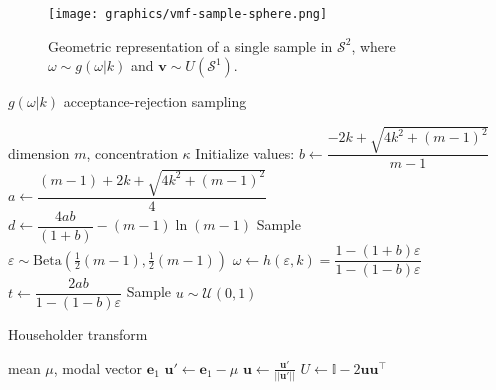 \documentclass[letterpaper]{article}
\newcommand{\e}{\mathbf{e}}
\newcommand{\uv}{\mathbf{u}}
\newcommand{\vv}{\mathbf{v}}
\begin{document}
\begin{figure}[H]\label{fig:sphere-sample-example}
  \centering
  \texttt{[image: graphics/vmf-sample-sphere.png]}
  \caption{Geometric representation of a single sample in $\mathcal{S}^2$, where $\omega \sim g(\omega|k)$ and $\vv \sim U(\mathcal{S}^{1})$.}
\end{figure}

\begin{minipage}[t]{8cm}
  \vspace{0pt}  
\begin{algorithm}[H]
    \centering
   \caption{$g(\omega| k)$ acceptance-rejection sampling}
   \label{alg:g-sample}
\begin{algorithmic}
     dimension $m$, concentration $\kappa$
    \STATE Initialize values:
    \STATE $b \gets \dfrac{-2k + \sqrt{4k^2 + (m-1)^2}}{m - 1}$\\
    \STATE $a \gets \dfrac{(m-1) + 2k +\sqrt{4k^2+(m-1)^2}}{4}$\\
    \STATE $d \gets \dfrac{4ab}{(1+b)} - (m - 1)\ln (m-1)$
    \REPEAT
    \STATE Sample $\varepsilon \sim \text{Beta}(\frac{1}{2}(m-1), \frac{1}{2}(m-1))$
    \STATE $\omega \gets h(\varepsilon, k) = \dfrac{1 - (1 + b)\varepsilon}{1 - (1 - b)\varepsilon}$
    \STATE $t \gets \dfrac{2ab}{1 - (1-b)\varepsilon}$
    \STATE Sample $u \sim \mathcal{U}(0,1)$
\end{algorithmic}
\end{algorithm}
\end{minipage}\hspace{2 cm}
\begin{minipage}[t]{6cm}
  \vspace{0pt}
\begin{algorithm}[H]
   \caption{Householder transform}
   \label{alg:householder-transform}
\begin{algorithmic}
     mean $\mu$, modal vector $\e_1$
    \STATE $\uv' \gets \e_1 - \mu$
    \STATE $\uv \gets \frac{\uv'}{||\uv'||}$
    \STATE $U \gets \mathbb{I} - 2\uv \uv^{\top}$
\end{algorithmic}
\end{algorithm}
\end{minipage}
\end{document}

